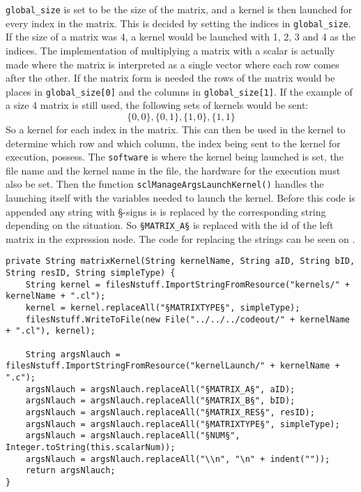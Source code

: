 \texttt{global\_size} is set to be the size of the matrix, and a kernel is then launched for every index in the matrix.
This is decided by setting the indices in \texttt{global\_size}.
If the size of a matrix was 4, a kernel would be launched with 1, 2, 3 and 4 as the indices. 
The implementation of multiplying a matrix with a scalar is actually made where the matrix is interpreted as a single vector where each row comes after the other.
If the matrix form is needed the rows of the matrix would be places in \texttt{global\_size[0]} and the columns in \texttt{global\_size[1]}.
If the example of a size 4 matrix is still used, the following sets of kernels would be sent:
\begin{equation}
\{0,0\}, \{0,1\}, \{1,0\}, \{1,1\}
\end{equation}
So a kernel for each index in the matrix.
This can then be used in the kernel to determine which row and which column, the index being sent to the kernel for execution, possess.
The \texttt{software} is where the kernel being launched is set, the file name and the kernel name in the file, the hardware for the execution must also be set.
Then the function \texttt{sclManageArgsLaunchKernel()} handles the launching itself with the variables needed to launch the kernel.
Before this code is appended any string with  \S-signs is is replaced by the corresponding string depending on the situation.
So \texttt{§MATRIX\_A§} is replaced with the id of the left matrix in the expression node.
The code for replacing the strings can be seen on .

\begin{lstlisting}[caption=Code for replacing strings with the corresponding information to be appended to the outputCode.,numbers=none,frame=tlrb,label={lst:replaceString}]
private String matrixKernel(String kernelName, String aID, String bID, String resID, String simpleType) {
    String kernel = filesNstuff.ImportStringFromResource("kernels/" + kernelName + ".cl");
    kernel = kernel.replaceAll("§MATRIXTYPE§", simpleType);
    filesNstuff.WriteToFile(new File("../../../codeout/" + kernelName + ".cl"), kernel);

    String argsNlauch = filesNstuff.ImportStringFromResource("kernelLaunch/" + kernelName + ".c");
    argsNlauch = argsNlauch.replaceAll("§MATRIX_A§", aID);
    argsNlauch = argsNlauch.replaceAll("§MATRIX_B§", bID);
    argsNlauch = argsNlauch.replaceAll("§MATRIX_RES§", resID);
    argsNlauch = argsNlauch.replaceAll("§MATRIXTYPE§", simpleType);
    argsNlauch = argsNlauch.replaceAll("§NUM§", Integer.toString(this.scalarNum));
    argsNlauch = argsNlauch.replaceAll("\\n", "\n" + indent(""));
    return argsNlauch;
}
\end{lstlisting}

